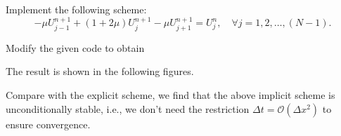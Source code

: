 \begin{pro}
  Implement the following scheme:
  \begin{displaymath}
    -\mu U_{j-1}^{n+1} + (1+2\mu)U_j^{n+1} - \mu U_{j+1}^{n+1} = U_j^n,
    \quad \forall j=1, 2, \ldots, (N-1).
  \end{displaymath}
\end{pro}
\begin{sol}
  Modify the given code to obtain
  
  The result is shown in the following figures.
  \begin{figure}[H]
  \centering
  \hfill
  \hfill
\end{figure}
Compare with the explicit scheme,
we find that the above implicit scheme is unconditionally stable,
i.e.,
we don't need the restriction $\Delta t = \mathcal{O}(\Delta x^2)$
to ensure convergence.
\end{sol}
